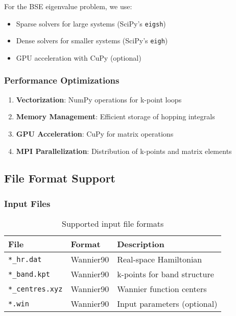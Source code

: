 \documentclass[11pt,a4paper]{article}
\newcommand{\code}[1]{\texttt{#1}}
\begin{document}
For the BSE eigenvalue problem, we use:
\begin{itemize}
    \item Sparse solvers for large systems (SciPy's \code{eigsh})
    \item Dense solvers for smaller systems (SciPy's \code{eigh})
    \item GPU acceleration with CuPy (optional)
\end{itemize}

\subsubsection{Performance Optimizations}

\begin{enumerate}
    \item \textbf{Vectorization}: NumPy operations for k-point loops
    \item \textbf{Memory Management}: Efficient storage of hopping integrals
    \item \textbf{GPU Acceleration}: CuPy for matrix operations
    \item \textbf{MPI Parallelization}: Distribution of k-points and matrix elements
\end{enumerate}

\subsection{File Format Support}

\subsubsection{Input Files}

\begin{table}[H]
\centering
\begin{tabular}{lll}
\toprule
File & Format & Description \\
\midrule
\code{*\_hr.dat} & Wannier90 & Real-space Hamiltonian \\
\code{*\_band.kpt} & Wannier90 & k-points for band structure \\
\code{*\_centres.xyz} & Wannier90 & Wannier function centers \\
\code{*.win} & Wannier90 & Input parameters (optional) \\
\bottomrule
\end{tabular}
\caption{Supported input file formats}
\end{table}
\end{document}
